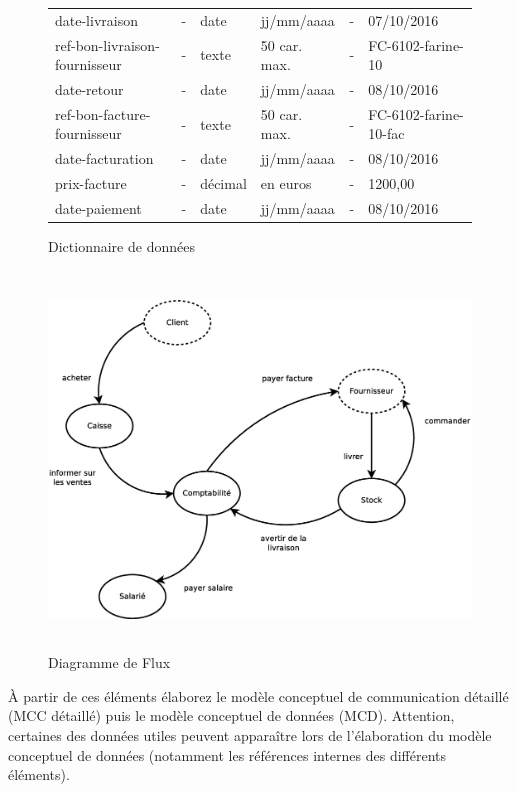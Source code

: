 \begin{figure}[!h]
\begin{tabular}{l l l l l l}
    date-livraison                & -                & date    & jj/mm/aaaa   & -            & 07/10/2016 \\
    ref-bon-livraison-fournisseur & -                & texte   & 50 car. max. & -            & FC-6102-farine-10 \\
    date-retour                   & -                & date    & jj/mm/aaaa   & -            & 08/10/2016 \\
    ref-bon-facture-fournisseur   & -                & texte   & 50 car. max. & -            & FC-6102-farine-10-fac \\
    date-facturation              & -                & date    & jj/mm/aaaa   & -            & 08/10/2016 \\
    prix-facture                  & -                & décimal & en euros     & -            & 1200,00 \\
    date-paiement                 & -                & date    & jj/mm/aaaa   & -            & 08/10/2016 \\
%
\end{tabular}
    \caption{\label{DD} Dictionnaire de données}
\end{figure}

\newpage

\begin{figure}[!h]
    \includegraphics[height=10cm]{images/dd_exo.eps} 
    \caption{\label{DF} Diagramme de Flux}
\end{figure}

À partir de ces éléments élaborez le modèle conceptuel de communication détaillé (MCC détaillé) puis le modèle conceptuel de données (MCD). Attention, certaines des données utiles peuvent apparaître lors de l'élaboration du modèle conceptuel de données (notamment les références internes des différents éléments).\\

